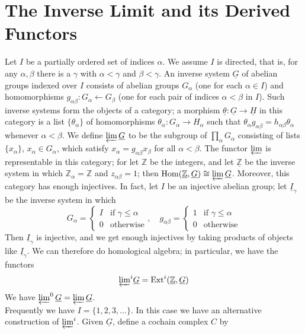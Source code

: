 \documentclass[../main]{subfiles}
\begin{document}
\label{sec:p3c08}
\chapter{The Inverse Limit and its Derived Functors}

Let $I$ be a partially ordered set of indices $\alpha$. We assume $I$ is directed, that is, for any $\alpha,\beta$ there is a $\gamma$ with $\alpha < \gamma$ and $\beta<\gamma$. An inverse system $\underline{G}$ of abelian groups indexed over $I$ consists of abelian groups $G_\alpha$ (one for each $\alpha \in I$) and homomorphisms $g_{\alpha\beta}:G_\alpha \longleftarrow G_\beta$ (one for each pair of indices $\alpha<\beta$ in $I$). Such inverse systems form the objects of a category; a morphism $\underline{\theta}:\underline{G}\longrightarrow\underline{H}$ in this category is a list $\{\theta_\alpha\}$ of homomorphisms $\theta_\alpha:G_\alpha \to H_\alpha$ such that $\theta_\alpha g_{\alpha\beta} = h_{\alpha\beta}\theta_\alpha$ whenever $\alpha < \beta$. We define $\varprojlim\underline{G}$ to be the subgroup of $\prod_\alpha G_\alpha$ consisting of lists $\{x_\alpha\}$, $x_\alpha\in G_\alpha$, which satisfy $x_\alpha = g_{\alpha\beta}x_\beta$ for all $\alpha<\beta$. The functor $\varprojlim$ is representable in this category; for let $\mathbb{Z}$ be the integers, and let $\underline{\mathbb{Z}}$ be the inverse system in which $\mathbb{Z}_\alpha = \mathbb{Z}$ and $z_{\alpha\beta}=1$; then $\operatorname{Hom}(\underline{\mathbb{Z}},\underline{G})\cong \varprojlim\underline{G}$. Moreover, this category has enough injectives. In fact, let $I$ be an injective abelian group; let $\underline{I}_\gamma$ be the inverse system in which
$$G_\alpha=\begin{cases}
  I  & \text{if } \gamma\leq\alpha \\
  0 & \text{otherwise}
\end{cases}, \quad 
g_{\alpha\beta}=\begin{cases} 1 & \text{if } \gamma\leq\alpha \\ 0 & \text{otherwise} \end{cases}$$ 
Then $\underline{I}_\gamma$ is injective, and we get enough injectives by taking products of objects like $\underline{I}_\gamma$. We can therefore do homological algebra; in particular, we have the functors
$${\varprojlim}^i\underline{G}=\operatorname{Ext}^i(\underline{\mathbb{Z}},\underline{G})$$
We have $\varprojlim^0\underline{G}=\varprojlim\underline{G}$. \\
Frequently we have $I=\{1,2,3,...\}$. In this case we have an alternative construction of ${\varprojlim}^i$. Given $\underline{G}$, define a cochain complex $C$ by 
\end{document}
